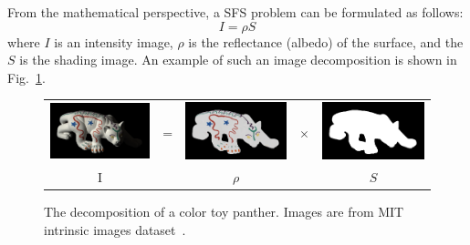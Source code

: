 From the mathematical perspective, a SFS problem can be formulated as follows:
\begin{equation}\label{eq:sfs_equation}
    I = \rho S
\end{equation}
where $I$ is an intensity image, $\rho$ is the reflectance (albedo) of the surface, and the $S$ is the shading image. 
An example of such an image decomposition is shown in Fig.~\ref{fig:shading}.
\begin{figure}[!htbp]
\centering
\setlength{\tabcolsep}{0.1em} %
 {\renewcommand{\arraystretch}{0.6}%
\begin{tabular}{c c c c c}
   \includegraphics[height = 0.16\linewidth]{figures/panther_rgb.png} \hspace{0.05cm}   &
   \multirow{-10}{*}{\parbox[t]{3.5mm}{=}}  & 
   \includegraphics[height = 0.16\linewidth]{figures/panther_rho.png} &
    \multirow{-10}{*}{\parbox[t]{3.5mm}{$\times$}}  & 
   \includegraphics[height = 0.16\linewidth]{figures/panther_shade.png} \\
      {I} &{} &{$\rho$} & {}& {$S$}            
 \end{tabular}}
\caption{The decomposition of a color toy panther. Images are from MIT intrinsic images dataset~\cite{grosse2009ground}.}
\label{fig:shading}
\end{figure}

